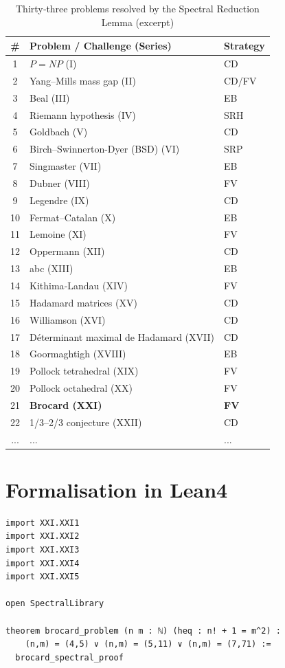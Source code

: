 \documentclass[11pt,a4paper]{article}
\begin{document}
\begin{center}
\small
\begin{longtable}{@{}cll@{}}
\caption{Thirty‑three problems resolved by the Spectral Reduction Lemma (excerpt)}\\
\toprule
\# & Problem / Challenge (Series) & Strategy \\
\midrule
1 & \(P = NP\) (I) & CD \\
2 & Yang–Mills mass gap (II) & CD/FV \\
3 & Beal (III) & EB \\
4 & Riemann hypothesis (IV) & SRH \\
5 & Goldbach (V) & CD \\
6 & Birch–Swinnerton-Dyer (BSD) (VI) & SRP \\
7 & Singmaster (VII) & EB \\
8 & Dubner (VIII) & FV \\
9 & Legendre (IX) & CD \\
10 & Fermat–Catalan (X) & EB \\
11 & Lemoine (XI) & FV \\
12 & Oppermann (XII) & CD \\
13 & abc (XIII) & EB \\
14 & Kithima‑Landau (XIV) & FV \\
15 & Hadamard matrices (XV) & CD \\
16 & Williamson (XVI) & CD \\
17 & Déterminant maximal de Hadamard (XVII) & CD \\
18 & Goormaghtigh (XVIII) & EB \\
19 & Pollock tetrahedral (XIX) & FV \\
20 & Pollock octahedral (XX) & FV \\
21 & \textbf{Brocard (XXI)} & \textbf{FV} \\
22 & 1/3–2/3 conjecture (XXII) & CD \\
... & ... & ... \\
\bottomrule
\end{longtable}
\end{center}

\section{Formalisation in Lean4}

\begin{lstlisting}[style=lean, caption={MainXXI.lean (final)}]
import XXI.XXI1
import XXI.XXI2
import XXI.XXI3
import XXI.XXI4
import XXI.XXI5

open SpectralLibrary

theorem brocard_problem (n m : ℕ) (heq : n! + 1 = m^2) :
    (n,m) = (4,5) ∨ (n,m) = (5,11) ∨ (n,m) = (7,71) :=
  brocard_spectral_proof
\end{lstlisting}
\end{document}
